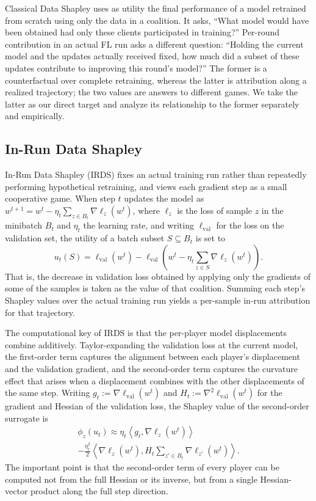 \documentclass[letterpaper]{article} %
\theoremstyle{definition} %
\newcommand{\lval}{\ell_{\mathrm{val}}} %
\begin{document}
Classical Data Shapley uses as utility the final performance of a model
retrained from scratch using only the data in a coalition. It asks,
``What model would have been obtained had
only these clients participated in training?'' Per-round contribution in an
actual FL run asks a different question: ``Holding the current model and the
updates actually received fixed, how much did a subset of these updates
contribute to improving this round's model?'' The former is a counterfactual
over complete retraining, whereas the latter is attribution along a realized
trajectory; the two values are answers to different games. We take the latter
as our direct target and analyze its relationship to the former separately
and empirically.

\subsection{In-Run Data Shapley}
\label{sec:irds}

In-Run Data Shapley (IRDS) fixes an actual training run
rather than repeatedly performing hypothetical retraining, and views each
gradient step as a small cooperative game. When step $t$ updates the model as
$w^{t+1}=w^t-\eta_t\sum_{z\in B_t}\nabla\ell_z(w^t)$, where $\ell_z$ is the
loss of sample $z$ in the minibatch $B_t$ and $\eta_t$ the learning rate, and
writing $\lval$ for the loss on the validation set,
the utility of a batch subset $S\subseteq B_t$ is set to
\begin{equation}
\label{eq:irds-utility}
u_t(S)
= \lval(w^t)
- \lval\left(
w^t-\eta_t\textstyle\sum_{z\in S}\nabla\ell_z(w^t)
\right).
\end{equation}
That is, the decrease in validation loss obtained by applying only the
gradients of some of the samples is taken as the value of that coalition.
Summing each step's Shapley values over the actual training run yields a
per-sample in-run attribution for that trajectory.

The computational key of IRDS is that the per-player model displacements
combine additively. Taylor-expanding the validation loss at the current
model, the first-order term captures the alignment between each player's
displacement and the validation gradient, and the second-order term captures
the curvature effect that arises when a displacement combines with the other
displacements of the same step. Writing
$g_t:=\nabla\lval(w^t)$ and $H_t:=\nabla^2\lval(w^t)$ for the gradient and
Hessian of the validation loss, the Shapley value of the second-order
surrogate is
\begin{multline}
\label{eq:irds-closed}
\phi_z(u_t)
\approx
\eta_t\left\langle g_t,\nabla\ell_z(w^t)\right\rangle\\
-\frac{\eta_t^2}{2}
\left\langle
\nabla\ell_z(w^t),
H_t\textstyle\sum_{z'\in B_t}\nabla\ell_{z'}(w^t)
\right\rangle.
\end{multline}
The important point is that the second-order term of every player can be
computed not from the full Hessian or its inverse, but from a single
Hessian-vector product along the full step direction.
\end{document}
